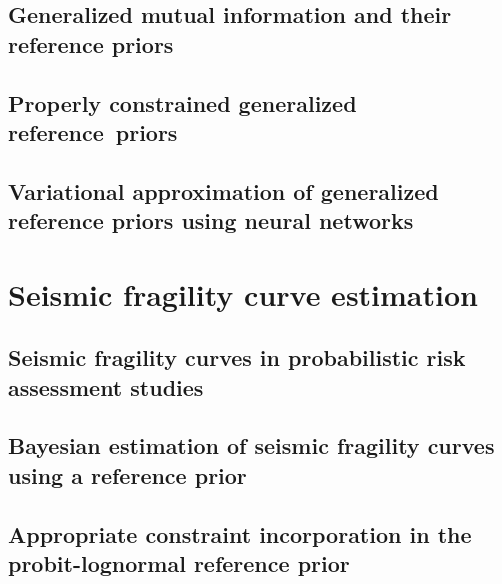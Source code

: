 \documentclass[a4paper]{book}
\begin{document}


\chapter{Generalized mutual information and their reference priors}\label{chap:ref-generalized}




\chapter{Properly constrained generalized reference~priors}\label{chap:constrained-prior}




\chapter{Variational approximation of generalized reference priors using neural networks}\label{chap:varp}




\part{Seismic fragility curve estimation}\label{part:spra}


\chapter{Seismic fragility curves in probabilistic risk assessment studies}\label{chap:frags-intro}




\chapter{Bayesian estimation of seismic fragility curves using a reference prior}\label{chap:prem}




\chapter{Appropriate constraint incorporation in the probit-lognormal reference prior%
}\label{chap:constrained-frags}
\end{document}
